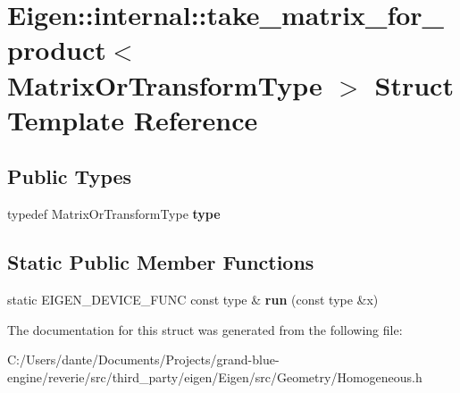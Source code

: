 \hypertarget{struct_eigen_1_1internal_1_1take__matrix__for__product}{}\section{Eigen\+::internal\+::take\+\_\+matrix\+\_\+for\+\_\+product$<$ Matrix\+Or\+Transform\+Type $>$ Struct Template Reference}
\label{struct_eigen_1_1internal_1_1take__matrix__for__product}
\subsection*{Public Types}
\begin{DoxyCompactItemize}
\item 
\mbox{\label{struct_eigen_1_1internal_1_1take__matrix__for__product_a9f9aed864d09934e140293bcaa9d307b}} 
typedef Matrix\+Or\+Transform\+Type {\bfseries type}
\end{DoxyCompactItemize}
\subsection*{Static Public Member Functions}
\begin{DoxyCompactItemize}
\item 
\mbox{\label{struct_eigen_1_1internal_1_1take__matrix__for__product_a7a90e0535b7ae9c428ecff0b5aec435e}} 
static E\+I\+G\+E\+N\+\_\+\+D\+E\+V\+I\+C\+E\+\_\+\+F\+U\+NC const type \& {\bfseries run} (const type \&x)
\end{DoxyCompactItemize}


The documentation for this struct was generated from the following file\+:\begin{DoxyCompactItemize}
\item 
C\+:/\+Users/dante/\+Documents/\+Projects/grand-\/blue-\/engine/reverie/src/third\+\_\+party/eigen/\+Eigen/src/\+Geometry/Homogeneous.\+h\end{DoxyCompactItemize}
